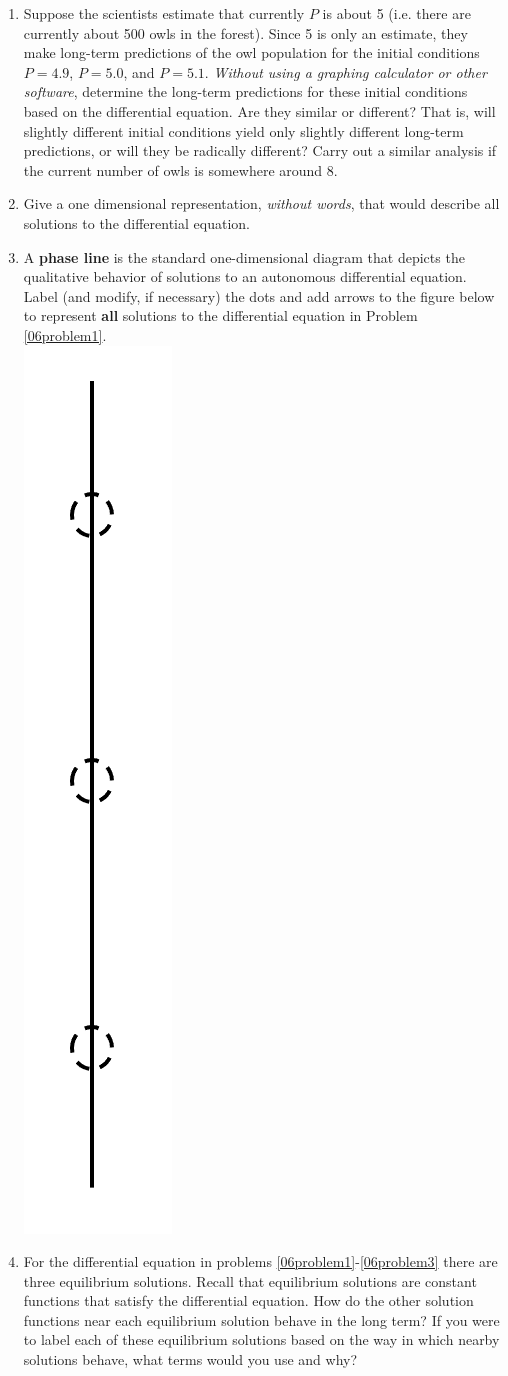 \begin{enumerate}
\item Suppose the scientists estimate that currently $P$ is about 5 (i.e. there are currently about 500 owls in the forest).  Since 5 is only an estimate, they make long-term predictions of the owl population for the initial conditions $P = 4.9$, $P = 5.0$, and $P = 5.1$. \textit{Without using a graphing calculator or other software}, determine the long-term predictions for these initial conditions based on the differential equation. Are they similar or different?  That is, will slightly different initial conditions yield only slightly different long-term predictions, or will they be radically different? Carry out a similar analysis if the current number of owls is somewhere around 8.\label{06problem1}
\vspace{4in}

\item Give a one dimensional representation, \textit{without words}, that would describe all solutions to the differential equation. \label{06problem2}

\clearpage
\item A \textbf{phase line} is the standard one-dimensional diagram that depicts the qualitative behavior of solutions to an autonomous differential equation. Label (and modify, if necessary) the dots and add arrows to the figure below to represent \textbf{all} solutions to the differential equation in Problem \ref{06problem1}. \label{06problem3} \\
\includegraphics[width=.75in]{06/06PhaseLine.png}

\item For the differential equation in problems \ref{06problem1}-\ref{06problem3} there are three equilibrium solutions. Recall that equilibrium solutions are constant functions that satisfy the differential equation. How do the other solution functions near each equilibrium solution behave in the long term? If you were to label each of these equilibrium solutions based on the way in which nearby solutions behave, what terms would you use and why? \label{06problem4} 

\end{enumerate}

